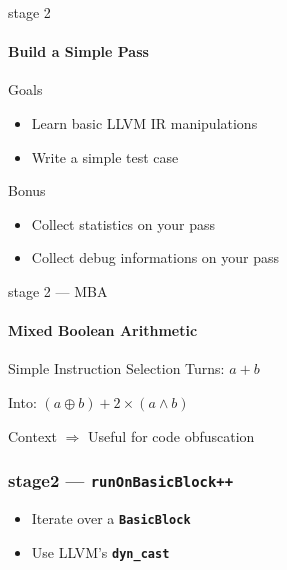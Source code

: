 \documentclass[14pt]{beamer}
\newcommand{\Code}[1]{\textbf{\texttt{#1}}}
\begin{document}
    \begin{frame}{stage 2}

        \framesubtitle{Build a Simple Pass}

        \begin{block}{Goals}
            \begin{itemize}
                \item Learn basic LLVM IR manipulations
                \item Write a simple test case
            \end{itemize}

        \end{block}

        \begin{alertblock}{Bonus}
            \begin{itemize}
                \item Collect statistics on your pass
                \item Collect debug informations on your pass
            \end{itemize}
        \end{alertblock}

    \end{frame}

    \begin{frame}{stage 2 --- MBA}
        \framesubtitle{Mixed Boolean Arithmetic}

        \begin{alertblock}{Simple Instruction Selection}
            Turns: $a + b$

            Into: $(a \oplus b) + 2 \times (a \wedge b)$
        \end{alertblock}

        \begin{block}{Context}
            \alert{$\Rightarrow$} Useful for code obfuscation
        \end{block}

    \end{frame}

    \begin{frame}[containsverbatim]
    \frametitle{stage2 --- \texttt{runOnBasicBlock++}}
    \begin{itemize}
        \item Iterate over a \Code{BasicBlock}
        \item Use LLVM's \Code{dyn\_cast}
    \end{itemize}
    {
        \scriptsize
        
    }
    \end{frame}
\end{document}
